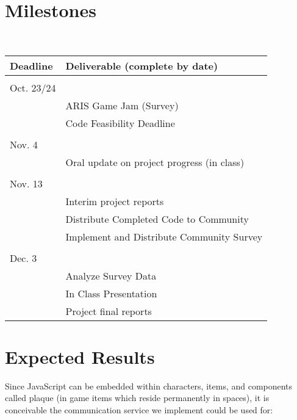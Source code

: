 \documentclass{sigchi}
\begin{document}
\section{Milestones}
\hfill \\
\begin{tabular}{l |l}
\large{Deadline}  & \large{Deliverable (complete by date)} \\
\hline \\
Oct. 23/24 &                                                                        \\
           & ARIS Game Jam (Survey)                                                 \\
           & Code Feasibility Deadline  \\
\hline \\
Nov. 4     &\\
            & Oral update on project progress (in class)                             \\
\hline \\
Nov. 13    &                                                                        \\
           & Interim project reports                                                \\
           & Distribute Completed Code to Community                                 \\
           & Implement and Distribute Community Survey                              \\
\hline \\
Dec. 3     &                                                                        \\
           & Analyze Survey Data                                                    \\
           & In Class Presentation                                                  \\
           & Project final reports                                                 
\end{tabular}

\section{Expected Results}
Since JavaScript can be embedded within characters, items, and components called plaque (in game items which reside permanently in spaces), it is conceivable the communication service we implement could be used for:
\end{document}
